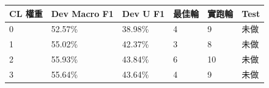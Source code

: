 \begin{tabular}{llllll}
\toprule
CL 權重 & Dev Macro F1 & Dev U F1 & 最佳輪 & 實跑輪 & Test\\
\midrule
0 & 52.57\% & 38.98\% & 4 & 9 & 未做\\
1 & 55.02\% & 42.37\% & 3 & 8 & 未做\\
2 & 55.93\% & 43.84\% & 6 & 10 & 未做\\
3 & 55.64\% & 43.64\% & 4 & 9 & 未做\\
\bottomrule
\end{tabular}
